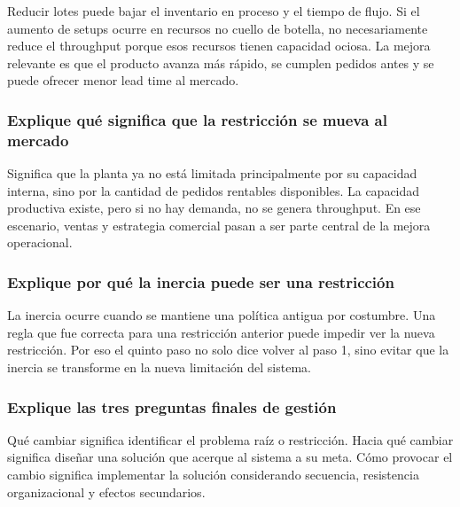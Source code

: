 \documentclass[
  11pt,
]{article}
\begin{document}
Reducir lotes puede bajar el inventario en proceso y el tiempo de flujo.
Si el aumento de setups ocurre en recursos no cuello de botella, no
necesariamente reduce el throughput porque esos recursos tienen
capacidad ociosa. La mejora relevante es que el producto avanza más
rápido, se cumplen pedidos antes y se puede ofrecer menor lead time al
mercado.

\hypertarget{explique-quuxe9-significa-que-la-restricciuxf3n-se-mueva-al-mercado}{%
\subsubsection{Explique qué significa que la restricción se mueva al
mercado}\label{explique-quuxe9-significa-que-la-restricciuxf3n-se-mueva-al-mercado}}

Significa que la planta ya no está limitada principalmente por su
capacidad interna, sino por la cantidad de pedidos rentables
disponibles. La capacidad productiva existe, pero si no hay demanda, no
se genera throughput. En ese escenario, ventas y estrategia comercial
pasan a ser parte central de la mejora operacional.

\hypertarget{explique-por-quuxe9-la-inercia-puede-ser-una-restricciuxf3n}{%
\subsubsection{Explique por qué la inercia puede ser una
restricción}\label{explique-por-quuxe9-la-inercia-puede-ser-una-restricciuxf3n}}

La inercia ocurre cuando se mantiene una política antigua por costumbre.
Una regla que fue correcta para una restricción anterior puede impedir
ver la nueva restricción. Por eso el quinto paso no solo dice volver al
paso 1, sino evitar que la inercia se transforme en la nueva limitación
del sistema.

\hypertarget{explique-las-tres-preguntas-finales-de-gestiuxf3n}{%
\subsubsection{Explique las tres preguntas finales de
gestión}\label{explique-las-tres-preguntas-finales-de-gestiuxf3n}}

Qué cambiar significa identificar el problema raíz o restricción. Hacia
qué cambiar significa diseñar una solución que acerque al sistema a su
meta. Cómo provocar el cambio significa implementar la solución
considerando secuencia, resistencia organizacional y efectos
secundarios.
\end{document}
